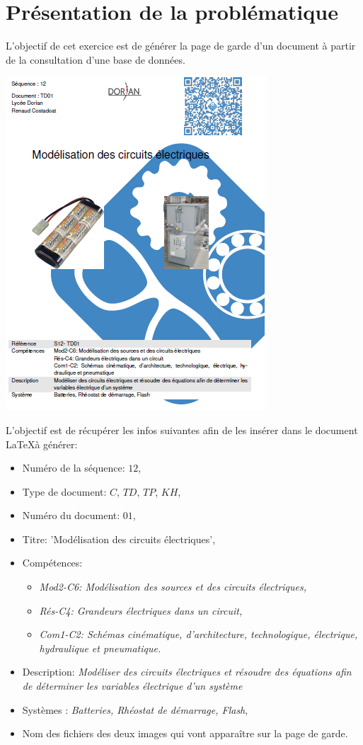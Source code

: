 





\section{Présentation de la problématique}

L'objectif de cet exercice est de générer la page de garde d'un document à partir de la consultation d'une base de données.

\begin{center}
 \includegraphics[width=0.6\linewidth]{img/img01}
\end{center}

L'objectif est de récupérer les infos suivantes afin de les insérer dans le document \LaTeX à générer:
\begin{itemize}
 \item Numéro de la séquence: $12$,
 \item Type de document: $C$, $TD$, $TP$, $KH$,
 \item Numéro du document: $01$, 
 \item Titre: 'Modélisation des circuits électriques',
 \item Compétences:
 	\begin{itemize}
  	\item \textit{Mod2-C6: Modélisation des sources et des circuits électriques,}
  	\item \textit{Rés-C4: Grandeurs électriques dans un circuit,}
  	\item \textit{Com1-C2: Schémas cinématique, d'architecture, technologique,	électrique, hydraulique et pneumatique.}
	\end{itemize}
 \item Description: \textit{Modéliser des circuits électriques et résoudre des équations afin de déterminer les
variables électrique d'un système}
 \item Systèmes : \textit{Batteries, Rhéostat de démarrage, Flash},
 \item Nom des fichiers des deux images qui vont apparaître sur la page de garde.
\end{itemize}


